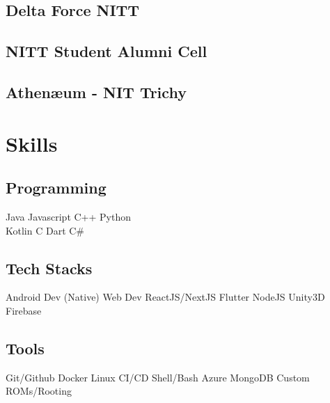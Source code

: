 \documentclass[]{deedy-resume-openfont}
\begin{document}
\begin{minipage}[t]{0.3\textwidth}
\subsection{Delta Force NITT}
\sectionsep

\subsection{NITT Student Alumni Cell}
\sectionsep

\subsection{Athenæum - NIT Trichy}

\section{Skills}

\subsection{Programming}
Java  \textbullet{} Javascript C++ \textbullet{} Python  \\
Kotlin \textbullet{} C \textbullet{} Dart \textbullet{} C\# \\ 
\sectionsep

\subsection{Tech Stacks}
Android Dev (Native) \textbullet{}   Web Dev  ReactJS/NextJS  \textbullet{} Flutter  \textbullet{} NodeJS Unity3D \textbullet{} Firebase 
\sectionsep

\subsection{Tools}
Git/Github  \textbullet{} Docker \textbullet{} Linux \textbullet{} CI/CD
\textbullet{} Shell/Bash \textbullet{} Azure \textbullet{} MongoDB \textbullet{}
Custom ROMs/Rooting \\ 

\end{minipage} 
\hfill
\end{document}
